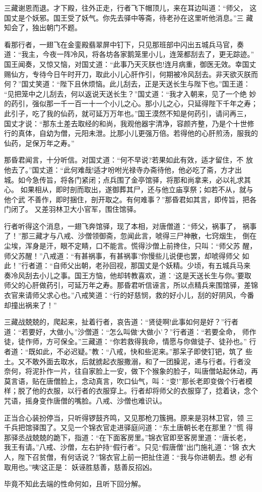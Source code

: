 三藏谢恩而退。才下殿，往外正走，行者飞下帽顶儿，来在耳边叫道：“师父，
这国丈是个妖邪。国王受了妖气。你先去驿中等斋，待老孙在这里听他消息。”三
藏知会了，独出朝门不题。

看那行者，一翅飞在金銮殿翡翠屏中钉下，只见那班部中闪出五城兵马官，奏
道：“我主，今夜一阵冷风，将各坊各家鹅笼里小儿，连笼都刮去了，更无踪迹。”
国王闻奏，又惊又恼，对国丈道：“此事乃天灭朕也!连月病重，御医无效。幸国丈
赐仙方，专待今日午时开刀，取此小儿心肝作引，何期被冷风刮去。非天欲灭朕而
何？”国丈笑道：“陛下且休烦恼。此儿刮去，正是天送长生与陛下也。”国王道：
“见把笼中之儿刮去，何以返说天送长生？”国丈道：“我才入朝来，见了一个绝
妙的药引，强似那一千一百一十一个小儿之心。那小儿之心，只延得陛下千年之寿；
此引子，吃了我的仙药，就可延万万年也。”国王漠然不知是何药引，请问再三，
国丈才说：“那东土差去取经的和尚，我观他器宇清净，容颜齐整，乃是个十世修
行的真体，自幼为僧，元阳未泄。比那小儿更强万倍。若得他的心肝煎汤，服我的
仙药，足保万年之寿。”

那昏君闻言，十分听信。对国丈道：“何不早说?若果如此有效，适才留住，不
放他去了。”国丈道：“此何难哉!适才吩咐光禄寺办斋待他，他必吃了斋，方才出
城。如今急传旨，将各门紧闭；点兵围了金亭馆驿，将那和尚拿来，必以礼求其心。
如果相从，即时剖而取出，遂御葬其尸，还与他立庙享祭；如若不从，就与他个武
不善作，即时捆住，剖开取之。有何难事？”那昏君如其言，即传旨，把各门闭了。
又差羽林卫大小官军，围住馆驿。

行者听得这个消息，一翅飞奔馆驿，现了本相，对唐僧道：“师父，祸事了，
祸事了！”那三藏才与八戒、沙僧领御斋，忽闻此言，唬得三尸神散，七窍烟生，
倒在尘埃，浑身是汗，眼不定睛，口不能言。慌得沙僧上前搀住，只叫：“师父苏
醒，师父苏醒！”八戒道：“有甚祸事，有甚祸事?你慢些儿说便也罢，却唬得师父
如此！”行者道：“自师父出朝，老孙回视，那国丈是个妖精。少顷，有五城兵马来
奏冷风刮去小儿之事。国王方恼，他却转教喜欢，道：‘这是天送长生与你。’要取
师父的心肝做药引，可延万年之寿。那昏君听信诬言，所以点精兵来围馆驿，差锦
衣官来请师父求心也。”八戒笑道：“行的好慈悯，救的好小儿，刮的好阴风，今番
却撞出祸来了！”

三藏战兢兢的，爬起来，扯着行者，哀告道：“贤徒啊!此事如何是好？”行者
道：“若要好，大做小。”沙僧道：“怎么叫做‘大做小’？”行者道：“若要全命，
师作徒，徒作师，方可保全。”三藏道：“你若救得我命，情愿与你做徒子、徒孙也。”
行者道：“既如此，不必迟疑。”教：“八戒，快和些泥来。”那呆子即使钉钯，筑了
些土。又不敢外面去取水，后就掳起衣服撒溺，和了一团臊泥，递与行者。行者没
奈何，将泥扑作一片，往自家脸上一安，做下个猴象的脸子，叫唐僧站起休动，再
莫言语，贴在唐僧脸上，念动真言，吹口仙气，叫：“变!”那长老即变做个行者模
样；脱了他的衣服，以行者的衣服穿上。行者却将师父的衣服穿了，捻着诀，念个
咒语，摇身变作唐僧的嘴脸。八戒、沙僧也难识认。

正当合心装扮停当，只听得锣鼓齐鸣，又见那枪刀簇拥。原来是羽林卫官，领
三千兵把馆驿围了。又见一个锦衣官走进驿庭问道：“东土唐朝长老在那里？”慌
得那驿丞战兢兢的跪下，指道：“在下面客房里。”锦衣官即至客房里道：“唐长老，
我王有请。”八戒、沙僧，左右护持“假行者”。只见“假唐僧”出门施礼道：“锦
衣大人，陛下召贫僧，有何话说？”锦衣官上前一把扯住道：“我与你进朝去。想
必有取用也。”咦!这正是：
妖诬胜慈善，慈善反招凶。

毕竟不知此去端的性命何如，且听下回分解。